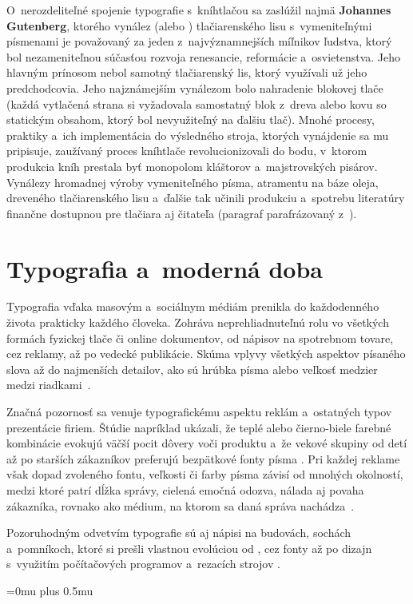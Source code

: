 \documentclass[a4paper, 11pt]{article}
\begin{document}
    O~nerozdeliteľné spojenie typografie s~kníhtlačou sa zaslúžil najmä \textbf{Johannes Gutenberg}, ktorého vynález (alebo  \cite{gutenberg}) tlačiarenského lisu s~vymeniteľnými písmenami je považovaný za jeden z~najvýznamnejších míľnikov ľudstva, ktorý bol nezameniteľnou súčasťou rozvoja renesancie, reformácie a~osvietenstva. Jeho hlavným prínosom nebol samotný tlačiarenský lis, ktorý využívali už jeho predchodcovia. Jeho najznámejším vynálezom bolo nahradenie blokovej tlače (každá vytlačená strana si vyžadovala samostatný blok z~dreva alebo kovu so statickým obsahom, ktorý bol nevyužiteľný na ďalšiu tlač). Mnohé procesy, praktiky a~ich implementácia do výsledného stroja, ktorých vynájdenie sa mu pripisuje, zaužívaný proces kníhtlače revolucionizovali do bodu, v~ktorom produkcia kníh prestala byť monopolom kláštorov a~majstrovských pisárov. Vynálezy hromadnej výroby vymeniteľného písma, atramentu na báze oleja, dreveného tlačiarenského lisu a~ďalšie tak učinili produkciu a~spotrebu literatúry finančne dostupnou pre tlačiara aj čitateľa (paragraf parafrázovaný z~\cite{gutenberg}).
    
\section{Typografia a~moderná doba}
    Typografia vďaka masovým a~sociálnym médiám prenikla do každodenného života prakticky každého človeka. Zohráva neprehliadnuteľnú rolu vo všetkých formách fyzickej tlače či online dokumentov, od nápisov na spotrebnom tovare, cez reklamy, až po vedecké publikácie. Skúma vplyvy všetkých aspektov písaného slova až do najmenších detailov, ako sú hrúbka písma alebo veľkosť medzier medzi riadkami~\cite{typographyStudy}.
    
    Značná pozornosť sa venuje typografickému aspektu reklám a~ostatných typov prezentácie firiem. Štúdie napríklad ukázali, že teplé alebo čierno-biele farebné kombinácie evokujú väčší pocit dôvery voči produktu a~že vekové skupiny od detí až po starších zákazníkov preferujú bezpätkové fonty písma \cite{sansserif}. Pri každej reklame však dopad zvoleného fontu, veľkosti či farby písma závisí od mnohých okolností, medzi ktoré patrí dĺžka správy, cielená emočná odozva, nálada aj povaha zákazníka, rovnako ako médium, na ktorom sa daná správa nachádza~\cite{adds}.
    
    Pozoruhodným odvetvím typografie sú aj nápisi na budovách, sochách a~pomníkoch, ktoré si prešli vlastnou evolúciou od , cez fonty  až po dizajn s~využitím počítačových programov a~rezacích strojov \cite{monumentlettering}.

\newpage
\Urlmuskip=0mu plus 0.5mu


\end{document}
